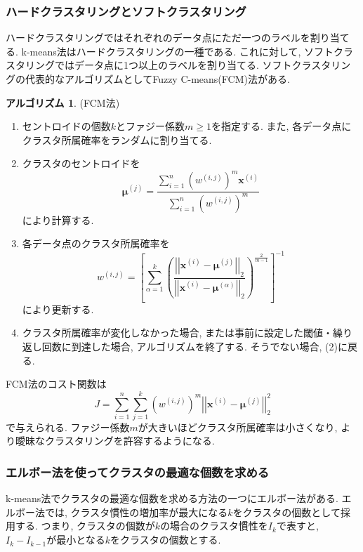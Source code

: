 \documentclass[uplatex]{jsarticle}
\theoremstyle{definition}
\newtheorem{algorithm}[definition]{アルゴリズム}
\numberwithin{equation}{section}
\newcommand{\norm}[1]{\left|\left|#1\right|\right|}
\begin{document}
\subsubsection{ハードクラスタリングとソフトクラスタリング}
ハードクラスタリングではそれぞれのデータ点にただ一つのラベルを割り当てる.
k-means法はハードクラスタリングの一種である.
これに対して, ソフトクラスタリングではデータ点に1つ以上のラベルを割り当てる.
ソフトクラスタリングの代表的なアルゴリズムとしてFuzzy C-means(FCM)法がある.

\begin{algorithm}
    (FCM法)
    \begin{enumerate}
        \item
        セントロイドの個数$k$とファジー係数$m \geq 1$を指定する.
        また, 各データ点にクラスタ所属確率をランダムに割り当てる.

        \item
        クラスタのセントロイドを
        \begin{equation}
            \bm{\mu}^{(j)} = \frac{\sum_{i = 1}^{n} (w^{(i, j)})^{m}\bm{x}^{(i)}}{\sum_{i = 1}^{n} (w^{(i, j)})^{m}}
        \end{equation}
        により計算する.

        \item
        各データ点のクラスタ所属確率を
        \begin{equation}
            w^{(i, j)} = \left[\sum_{\alpha = 1}^{k} \left(\frac{\norm{\bm{x}^{(i)} - \bm{\mu}^{(j)}}_{2}}{\norm{\bm{x}^{(i)} - \bm{\mu}^{(\alpha)}}_{2}}\right)^{\frac{2}{m - 1}}\right]^{-1}
        \end{equation}
        により更新する.

        \item
        クラスタ所属確率が変化しなかった場合, または事前に設定した閾値・繰り返し回数に到達した場合, アルゴリズムを終了する.
        そうでない場合, (2)に戻る.
    \end{enumerate}
\end{algorithm}

FCM法のコスト関数は
\begin{equation}
    J = \sum_{i = 1}^{n} \sum_{j = 1}^{k} (w^{(i, j)})^{m}\norm{\bm{x}^{(i)} - \bm{\mu}^{(j)}}_{2}^{2}
\end{equation}
で与えられる.
ファジー係数$m$が大きいほどクラスタ所属確率は小さくなり, より曖昧なクラスタリングを許容するようになる.

\subsubsection{エルボー法を使ってクラスタの最適な個数を求める}
k-means法でクラスタの最適な個数を求める方法の一つにエルボー法がある.
エルボー法では, クラスタ慣性の増加率が最大になる$k$をクラスタの個数として採用する.
つまり, クラスタの個数が$k$の場合のクラスタ慣性を$I_{k}$で表すと, $I_{k} - I_{k - 1}$が最小となる$k$をクラスタの個数とする.
\end{document}
